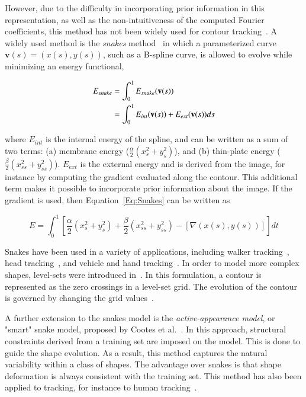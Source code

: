 However, due to the difficulty in incorporating prior information in this representation, as well as the non-intuitiveness of the computed Fourier coefficients, this method has not been widely used for contour tracking~\cite{2010_CNF_VehicleContour_Aslam}.  A widely used method is the \emph{snakes} method~\cite{1988_JNL_Snakes_Kass} in which a parameterized curve $\mathbf{v}(s) = (x(s), y(s))$, such as a B-spline curve, is allowed to evolve while minimizing an energy functional,

\begin{align}
E_{snake} &= \int_0^1 E_{snake}(\mathbf{v}(s)) \notag\\
&=\int_0^1 E_{int}(\mathbf{v}(s)) + E_{ext}(\mathbf{v}(s)) ds
\label{Eq:Snakes}
\end{align}

where $E_{int}$ is the internal energy of the spline, and can be written as a sum of two terms: (a) membrane energy ($\frac{\alpha}{2}(x_s^2 + y_s^2)$), and (b) thin-plate energy ($\frac{\beta}{2}(x_{ss}^2 + y_{ss}^2)$).  $E_{ext}$ is the external energy and is derived from the image, for instance by computing the gradient evaluated along the contour.  This additional term makes it possible to incorporate prior information about the image.  If the gradient is used, then Equation~\ref{Eq:Snakes} can be written as

\begin{equation}
	\label{eq:SnakesEnergy1}
	E=\int_0^1 \left[\frac{\alpha}{2}(x_s^2 + y_s^2) + \frac{\beta}{2}(x_{ss}^2 + y_{ss}^2) - \left[\nabla{(x(s), y(s))}\right]\right]dt
\end{equation}

Snakes have been used in a variety of applications, including walker tracking~\cite{1994_CNF_WalkingFiguresXYT_Niyogi}, head tracking~\cite{2001_JNL_ProbabilisticDataAssociation_Rasmussen}, and vehicle and hand tracking~\cite{1999_JNL_KalmanSnakes_Peterfreund}.  In order to model more complex shapes, level-sets were introduced in~\cite{1995_JNL_LevelSets_Malladi}.  In this formulation, a contour is represented as the zero crossings in a level-set grid.  The evolution of the contour is governed by changing the grid values~\cite{2006_JNL_SURVEYtrk_Yilmaz}.  

A further extension to the snakes model is the \emph{active-appearance model}, or "smart" snake model, proposed by Cootes et al.~\cite{1995_JNL_ActiveModels_Cootes}.  In this approach, structural constraints derived from a training set are imposed on the model.  This is done to guide the shape evolution.  As a result, this method captures the natural variability within a class of shapes.  The advantage over snakes is that shape deformation is always consistent with the training set.  This method has also been applied to tracking, for instance to human tracking~\cite{1994_CNF_ContourTracking_BaumbergHogg, 2003_JNL_ActiveShapeTracking_Koschan}.

